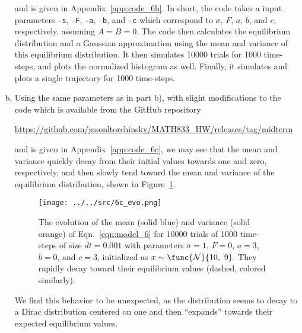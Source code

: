 \begin{enumerate}[a)]
	and is given in Appendix~\ref{app:code_6b}. In short, the code takes a input parameters \texttt{-s}, \texttt{-F}, \texttt{-a}, \texttt{-b}, and \texttt{-c} which correspond to $\sigma$, $F$, $a$, $b$, and $c$, respectively, assuming $A = B = 0$. The code then calculates the equilibrium distribution and a Gaussian approximation using the mean and variance of this equilibrium distribution. It then simulates 10000 trials for 1000 time-steps, and plots the normalized histogram as well. Finally, it simulates and plots a single trajectory for 1000 time-steps.

	\item Using the same parameters as in part b), with slight modifications to the code which is available from the GitHub repository
	
	\begin{center}
		\url{https://github.com/jasonltorchinsky/MATH833_HW/releases/tag/midterm}
	\end{center}

	and is given in Appendix~\ref{app:code_6c}, we may see that the mean and variance quickly decay from their initial values towards one and zero, respectively, and then slowly tend toward the mean and variance of the equilibrium distribution, shown in Figure~\ref{fig:6c_evo}.
	
	\begin{figure}[H]
		\centering
		\texttt{[image: ../../src/6c\_evo.png]}
		\caption{The evolution of the mean (solid blue) and variance (solid orange) of Eqn.~\ref{eqn:model_6} for 10000 trials of 1000 time-steps of size $dt = 0.001$ with parameters $\sigma = 1$, $F = 0$, $a = 3$, $b = 0$, and $c = 3$, initialized as $x \sim \func{\mathcal{N}}{10,\ 9}$. They rapidly decay toward their equilibrium values (dashed, colored similarly).}
		\label{fig:6c_evo}
	\end{figure}
	
	We find this behavior to be unexpected, as the distribution seems to decay to a Dirac distribution centered on one and then ``expands'' towards their expected equilibrium values.
	
\end{enumerate}